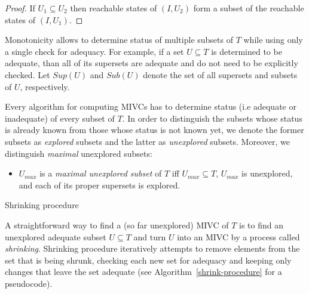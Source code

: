 \begin{proof}
If $U_1 \subseteq U_2$ then reachable states of $(I, U_2)$ form  a subset of the reachable states
of $(I, U_1)$.
\end{proof}
%


Monotonicity allows  to determine status  of multiple subsets of $T$ while using only a single check for adequacy. For example, if a set $U \subseteq T$ is determined to be adequate, than all of its supersets are   adequate and do not need to be explicitly checked. Let     $\mathit{Sup}(U)$ and $\mathit{Sub}(U)$ denote the set of all supersets and subsets of $U$, respectively.

Every algorithm for computing MIVCs has to determine status (i.e adequate or inadequate) of every subset of $T$.  In order to distinguish the subsets whose status is already known from those whose status is not known yet, we denote the former subsets as \emph{explored} subsets and the latter as \emph{unexplored} subsets. Moreover, we distinguish \emph{maximal} unexplored subsets:
\begin{itemize}
	\item $U_{max}$ is a \emph{maximal unexplored subset} of $T$ iff $U_{max} \subseteq T$, $U_{max}$ is unexplored, and each of its proper supersets is explored.
\end{itemize}



\begin{algorithm}[!t]\label{shrink-procedure}

\caption{Shrinking procedure }
\end{algorithm}


A straightforward way to find a (so far unexplored) MIVC of $T$ is to find an unexplored adequate subset $U \subseteq T$ and turn $U$  into an MIVC by a process called \emph{shrinking}. Shrinking procedure iteratively attempts to remove elements from the set that is being shrunk, checking each new set for adequacy and keeping only changes that
leave the set adequate (see Algorithm~\ref{shrink-procedure} for a pseudocode).

